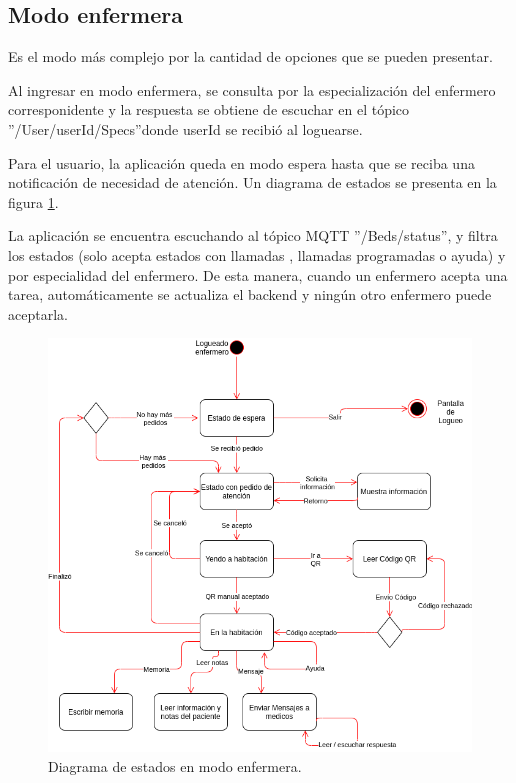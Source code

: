 \pagebreak
\subsection{Modo enfermera}

Es el modo más complejo por la cantidad de opciones que se pueden presentar.

Al ingresar en modo enfermera, se consulta por la especialización del enfermero corresponidente y la respuesta se obtiene de escuchar en el tópico ''/User/userId/Specs''donde userId se recibió al loguearse.

Para el usuario, la aplicación queda en modo espera hasta que se reciba una notificación de necesidad de atención. Un diagrama de estados se presenta en la figura \ref{fig: Diagrama de estados en modo enfermera.}.

 

La aplicación se encuentra escuchando al tópico MQTT ''/Beds/status'', y filtra los estados (solo acepta estados con llamadas , llamadas programadas o ayuda) y por especialidad del enfermero. De esta manera, cuando un enfermero acepta una tarea, automáticamente se actualiza el backend y ningún otro enfermero puede aceptarla.



\begin{figure}[ht]
	\centering
	\includegraphics[scale=.60]{./Figures/app/estados-enf.png}
	\caption{ Diagrama de estados en modo enfermera.}
	\label{fig: Diagrama de estados en modo enfermera.}
\end{figure} 


